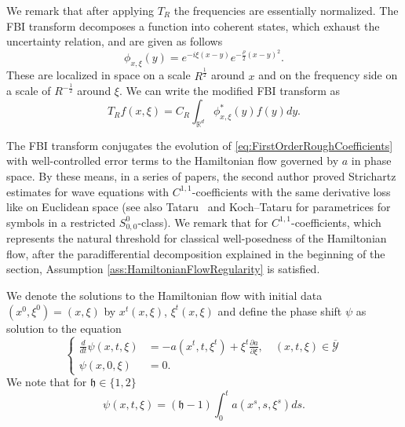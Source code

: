 \documentclass{amsart}
\theoremstyle{definition}
\newcommand{\R}{\mathbb{R}}
\begin{document}
We remark that after applying $T_R$ the frequencies are essentially normalized. 
The FBI transform decomposes a function into coherent states,
which exhaust the uncertainty relation, and are given as follows
\begin{equation}
\label{eq:CoherentStates}
\phi_{x,\xi}(y) = e^{- i \xi(x-y)} e^{-\frac{\rho}{2}(x-y)^2}.
\end{equation}
These are localized in space on a scale $R^{\frac{1}{2}}$ around $x$ and on the frequency side on a scale of $R^{-\frac{1}{2}}$ around $\xi$. We can write the modified FBI transform as
\begin{equation*}
T_R f(x,\xi) = C_R \int_{\R^{d}} \phi^*_{x,\xi}(y) f(y) dy.
\end{equation*}

The FBI transform conjugates the evolution of \eqref{eq:FirstOrderRoughCoefficients} with well-controlled error terms to the Hamiltonian flow governed by $a$ in phase space.
By these means, in a series of papers, the second author \cite{Tataru2000, Tataru2002,Tataru03} proved Strichartz estimates for wave equations with $C^{1,1}$-coefficients with the same derivative loss like on Euclidean space (see also Tataru~\cite{T:phase-space} and Koch--Tataru \cite{KochTataru05} for parametrices for symbols in a restricted $S^0_{0,0}$-class).
We remark that for $C^{1,1}$-coefficients, which represents the natural threshold for classical well-posedness of the Hamiltonian flow, after the paradifferential decomposition explained in the beginning of the section, Assumption \ref{ass:HamiltonianFlowRegularity} is satisfied.

We denote the solutions to the Hamiltonian flow with initial data $(x^0,\xi^0)=(x,\xi)$ by $x^t(x,\xi)$, $\xi^t(x,\xi)$ and define the phase shift $\psi$ as solution to the equation
\begin{equation*}
\left\{ \begin{array}{cl}
\frac{d}{dt} \psi (x,t,\xi) &= - a(x^t,t,\xi^t)+ \xi^t \frac{\partial a}{\partial \xi}, \quad (x,t,\xi) \in \overline{\mathcal{Y}} \\
\psi(x,0,\xi) &= 0.
\end{array} \right.
\end{equation*}
We note that for $\mathfrak{h} \in \{1,2\}$ 
\begin{equation*}
\psi(x,t,\xi) = (\mathfrak{h}-1) \int_0^t a(x^s,s,\xi^s) ds.
\end{equation*}

\medskip
\end{document}
